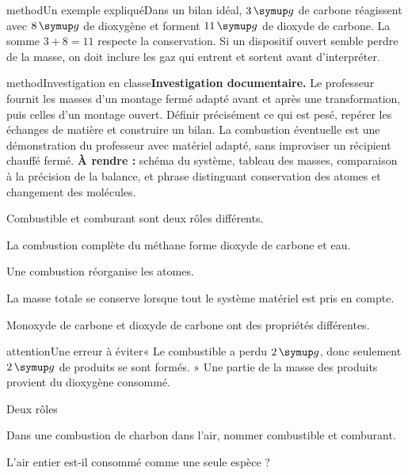 \begin{pcEncadre}{method}{Un exemple expliqué}Dans un bilan idéal, $3\unite g$ de carbone réagissent avec $8\unite g$ de dioxygène et forment $11\unite g$ de dioxyde de carbone. La somme $3+8=11$ respecte la conservation. Si un dispositif ouvert semble perdre de la masse, on doit inclure les gaz qui entrent et sortent avant d’interpréter.\end{pcEncadre}
\label{activite-7}
\begin{pcEncadre}{method}{Investigation en classe}\textbf{Investigation documentaire.} Le professeur fournit les masses d’un montage fermé adapté avant et après une transformation, puis celles d’un montage ouvert. Définir précisément ce qui est pesé, repérer les échanges de matière et construire un bilan. La combustion éventuelle est une démonstration du professeur avec matériel adapté, sans improviser un récipient chauffé fermé. \textbf{À rendre :} schéma du système, tableau des masses, comparaison à la précision de la balance, et phrase distinguant conservation des atomes et changement des molécules.\end{pcEncadre}
\begin{questions}
\item Combustible et comburant sont deux rôles différents.
\item La combustion complète du méthane forme dioxyde de carbone et eau.
\item Une combustion réorganise les atomes.
\item La masse totale se conserve lorsque tout le système matériel est pris en compte.
\item Monoxyde de carbone et dioxyde de carbone ont des propriétés différentes.
\end{questions}
\begin{pcEncadre}{attention}{Une erreur à éviter}« Le combustible a perdu $2\unite g$, donc seulement $2\unite g$ de produits se sont formés. » Une partie de la masse des produits provient du dioxygène consommé.\end{pcEncadre}
\pcGrille
\clearpage{}
\par\noindent\begin{minipage}{\linewidth}
\begin{exercice}[1]{Deux rôles}
\begin{questions}
\item Dans une combustion de charbon dans l’air, nommer combustible et comburant.
\item L’air entier est-il consommé comme une seule espèce ?
\end{questions}
\end{exercice}
\end{minipage}
